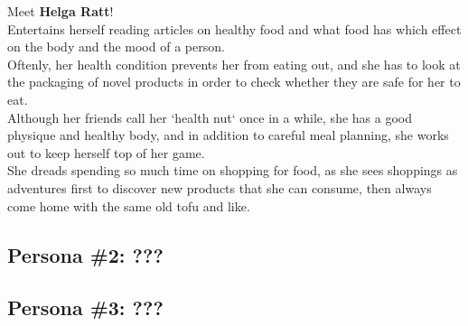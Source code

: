 \documentclass[a4paper,10pt,oneside]{scrreprt}
\begin{document}
\begin{mdframed}
\begin{minipage}{\textwidth}
				
				Meet \textbf{Helga Ratt}!\\
				
				Entertains herself reading articles on healthy food and what food has which effect on the body and the mood of a person.\\
				
				
				
				Oftenly, her health condition prevents her from eating out, and she has to look at the packaging of novel products in order to check whether they are safe for her to eat.\\
				
				
				
				Although her friends call her `health nut` once in a while, she has a good physique and healthy body, and in addition to careful meal planning, she works out to keep herself top of her game.\\
				
				She dreads spending so much time on shopping for food, as she sees shoppings as adventures first to discover new products that she can consume, then always come home with the same old tofu and like.\\
			\end{minipage}
		\end{mdframed}
	
		\subsection{Persona \#2: ???}
		
		\subsection{Persona \#3: ???}
\end{document}
